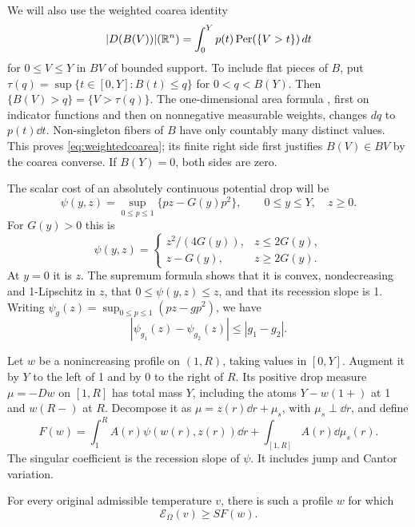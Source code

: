 We will also use the weighted coarea identity
\begin{equation}\label{eq:weightedcoarea}
 |D(B(V))|(\mathbb R^n)=\int_0^Y p(t)\operatorname{Per}(\{V>t\})\,d t
\end{equation}
for \(0\le V\le Y\) in \(BV\) of bounded support. To include flat pieces
of \(B\), put
\(\tau(q)=\sup\{t\in[0,Y]:B(t)\le q\}\) for \(0<q<B(Y)\).
Then \(\{B(V)>q\}=\{V>\tau(q)\}\). The one-dimensional area formula
\cite[Theorem~2.8]{LV}, first on indicator functions and then on
nonnegative measurable weights, changes \(dq\) to \(p(t)\dd t\).
Non-singleton fibers of \(B\) have only countably many distinct values.
This proves \eqref{eq:weightedcoarea}; its finite right side first
justifies \(B(V)\in BV\) by the coarea converse. If \(B(Y)=0\), both
sides are zero.

The scalar cost of an absolutely continuous potential drop will be
\begin{equation}\label{eq:psi}
 \psi(y,z)=\sup_{0\le p\le1}\{pz-G(y)p^2\},\qquad0\le y\le Y,\quad z\ge0.
\end{equation}
For \(G(y)>0\) this is
\[
 \psi(y,z)=
 \begin{cases}
 z^2/(4G(y)),&z\le2G(y),\\
 z-G(y),&z\ge2G(y).
 \end{cases}
\]
At \(y=0\) it is \(z\). The supremum formula shows that it is convex,
nondecreasing and 1-Lipschitz in \(z\), that \(0\le\psi(y,z)\le z\),
and that its recession slope is 1. Writing
\(\psi_g(z)=\sup_{0\le p\le1}(pz-gp^2)\), we have
\begin{equation}\label{eq:psilip}
 |\psi_{g_1}(z)-\psi_{g_2}(z)|\le |g_1-g_2| .
\end{equation}

Let \(w\) be a nonincreasing profile on \((1,R)\), taking values in
\([0,Y]\). Augment it by \(Y\) to the left of 1 and by 0 to the right
of \(R\). Its positive drop measure \(\mu=-Dw\) on \([1,R]\) has total
mass \(Y\), including the atoms \(Y-w(1+)\) at 1 and \(w(R-)\) at \(R\).
Decompose it as
\(\mu=z(r)\dd r+\mu_s\), with \(\mu_s\perp\dd r\), and define
\begin{equation}\label{eq:F}
 F(w)=\int_1^R A(r)\psi(w(r),z(r))\dd r+
                              \int_{[1,R]}A(r)\dd\mu_s(r).
\end{equation}
The singular coefficient is the recession slope of \(\psi\).
It includes jump and Cantor variation.

\begin{proposition}\label{prop:lower}
For every original admissible temperature \(v\), there is such a
profile \(w\) for which
\begin{equation}\label{eq:lower}
 \mathcal E_\Omega(v)\ge S F(w).
\end{equation}
\end{proposition}

